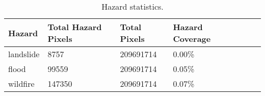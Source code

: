\begin{table}[h!]
    \centering
    \begin{tabularx}{0.45\textwidth}{@{}lXXXXXX@{}}
    \toprule
    \textbf{Hazard} & \textbf{Total Hazard Pixels} & \textbf{Total Pixels} & \textbf{Hazard Coverage} \\
    \midrule
    landslide & 8757 & 209691714 & 0.00\% \\
    flood & 99559 & 209691714 & 0.05\% \\
    wildfire & 147350 & 209691714 & 0.07\% \\
    \bottomrule
    \end{tabularx}
    \caption{Hazard statistics.}
    \label{tab:hazard_stats}
\end{table}
